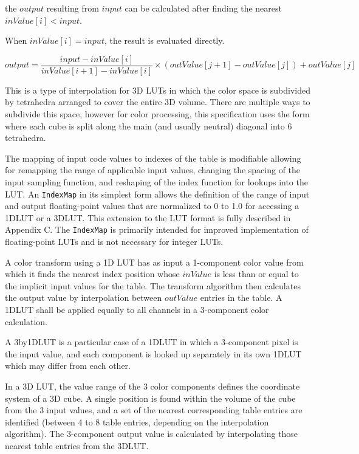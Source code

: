 the $output$ resulting from $input$ can be calculated after finding the nearest $inValue[i] < input$. 

When $inValue[i] = input$, the result is evaluated directly.

\begin{center}
$output = \dfrac{input-inValue[i]}{inValue[i+1]-inValue[i]} \times (outValue[j+1]-outValue[j])+outValue[j]$	
\end{center}
 
This is a type of interpolation for 3D LUTs in which the color space is subdivided by tetrahedra arranged to cover the entire 3D volume.  There are multiple ways to subdivide this space, however for color processing, this specification uses the form where each cube is split along the main (and usually neutral) diagonal into 6 tetrahedra.

The mapping of input code values to indexes of the table is modifiable allowing for remapping the range of applicable input values, changing the spacing of the input sampling function, and reshaping of the index function for lookups into the LUT. An \texttt{IndexMap} in its simplest form allows the definition of the range of input and output floating-point values that are normalized to 0 to 1.0 for accessing a 1DLUT or a 3DLUT. This extension to the LUT format is fully described in Appendix C. The \texttt{IndexMap} is primarily intended for improved implementation of floating-point LUTs and is not necessary for integer LUTs.

A color transform using a 1D LUT has as input a 1-component color value from which it finds the nearest index position whose $inValue$ is less than or equal to the implicit input values for the table. The transform algorithm then calculates the output value by interpolation between $outValue$ entries in the table. A 1DLUT shall be applied equally to all channels in a 3-component color calculation.

A 3by1DLUT is a particular case of a 1DLUT in which a 3-component pixel is the input value, and each component is looked up separately in its own 1DLUT which may differ from each other.

In a 3D LUT, the value range of the 3 color components defines the coordinate system of a 3D cube. A single position is found within the volume of the cube from the 3 input values, and a set of the nearest corresponding table entries are identified (between 4 to 8 table entries, depending on the interpolation algorithm). The 3-component output value is calculated by interpolating those nearest table entries from the 3DLUT.

